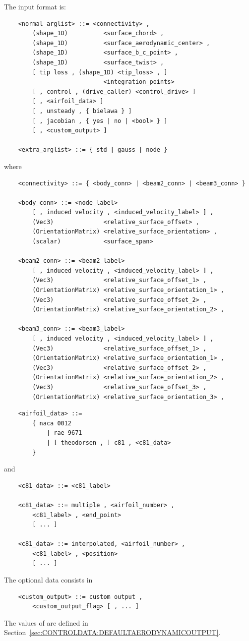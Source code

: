 The input format is:
\begin{verbatim}
    <normal_arglist> ::= <connectivity> ,
        (shape_1D)          <surface_chord> ,
        (shape_1D)          <surface_aerodynamic_center> ,
        (shape_1D)          <surface_b_c_point> ,
        (shape_1D)          <surface_twist> ,
        [ tip loss , (shape_1D) <tip_loss> , ]
                            <integration_points>
        [ , control , (drive_caller) <control_drive> ] 
        [ , <airfoil_data> ]
        [ , unsteady , { bielawa } ]
        [ , jacobian , { yes | no | <bool> } ]
        [ , <custom_output> ]

    <extra_arglist> ::= { std | gauss | node }
\end{verbatim}
where
\begin{verbatim}
    <connectivity> ::= { <body_conn> | <beam2_conn> | <beam3_conn> }

    <body_conn> ::= <node_label> 
        [ , induced velocity , <induced_velocity_label> ] ,
        (Vec3)              <relative_surface_offset> , 
        (OrientationMatrix) <relative_surface_orientation> ,
        (scalar)            <surface_span>

    <beam2_conn> ::= <beam2_label> 
        [ , induced velocity , <induced_velocity_label> ] ,
        (Vec3)              <relative_surface_offset_1> ,       
        (OrientationMatrix) <relative_surface_orientation_1> ,
        (Vec3)              <relative_surface_offset_2> ,
        (OrientationMatrix) <relative_surface_orientation_2> ,

    <beam3_conn> ::= <beam3_label> 
        [ , induced velocity , <induced_velocity_label> ] ,
        (Vec3)              <relative_surface_offset_1> ,       
        (OrientationMatrix) <relative_surface_orientation_1> ,
        (Vec3)              <relative_surface_offset_2> ,
        (OrientationMatrix) <relative_surface_orientation_2> ,
        (Vec3)              <relative_surface_offset_3> ,       
        (OrientationMatrix) <relative_surface_orientation_3> ,
\end{verbatim}
\begin{verbatim}
    <airfoil_data> ::=
        { naca 0012
            | rae 9671
            | [ theodorsen , ] c81 , <c81_data>
        }
\end{verbatim}
and
\begin{verbatim}
    <c81_data> ::= <c81_label> 

    <c81_data> ::= multiple , <airfoil_number> ,
        <c81_label> , <end_point>
        [ ... ]

    <c81_data> ::= interpolated, <airfoil_number> ,
        <c81_label> , <position>
        [ ... ]
\end{verbatim}
The  optional data consists in
\begin{verbatim}
    <custom_output> ::= custom output , 
        <custom_output_flag> [ , ... ]
\end{verbatim}
The values of 
are defined in Section~\ref{sec:CONTROLDATA:DEFAULTAERODYNAMICOUTPUT}.

